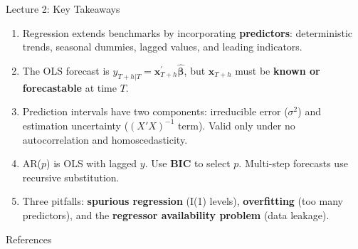 \documentclass[aspectratio=169, 11pt]{beamer}
\begin{document}
\begin{frame}{Lecture 2: Key Takeaways}
  \begin{keybox}
    \small
    \begin{enumerate}
      \item Regression extends benchmarks by incorporating \textbf{predictors}:
            deterministic trends, seasonal dummies, lagged values,
            and leading indicators.
      \item The OLS forecast is $\hat{y}_{T+h|T} = \mathbf{x}_{T+h}^{\prime}\hat{\boldsymbol{\beta}}$,
            but $\mathbf{x}_{T+h}$ must be \textbf{known or forecastable} at time $T$.
      \item Prediction intervals have two components: irreducible error
            ($\sigma^2$) and estimation uncertainty ($(X'X)^{-1}$ term).
            Valid only under no autocorrelation and homoscedasticity.
      \item AR($p$) is OLS with lagged $y$. Use \textbf{BIC} to select $p$.
            Multi-step forecasts use recursive substitution.
      \item Three pitfalls: \textbf{spurious regression} (I(1) levels),
            \textbf{overfitting} (too many predictors), and the
            \textbf{regressor availability problem} (data leakage).
    \end{enumerate}
  \end{keybox}
  \vspace{0.1cm}
\end{frame}

\begin{frame}[allowframebreaks]{References}
  \printbibliography[heading=none]
\end{frame}
\end{document}
